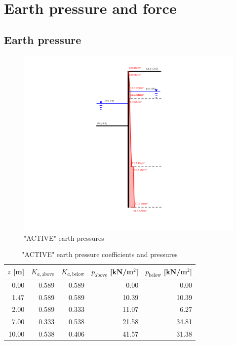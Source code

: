 \section{Earth pressure and force}
\label{appendix:earth_pressure}

\subsection{Earth pressure}

\begin{figure}[H]
    \centering
    \includegraphics[width=0.75\linewidth]{figures/appendix-i/active_earth_pressure.png}
    \caption{"ACTIVE" earth pressures}
    \label{fig:appendix_earth_pressure}
\end{figure}

\begin{table}[H]
  \centering
  \caption{"ACTIVE" earth pressure coefficients and pressures}
  \label{tab:appendix_active_pressures}
  \small
  \setlength{\tabcolsep}{8pt}
  \renewcommand{\arraystretch}{1.15}
  \begin{tabular}{@{}r r r r r@{}}
    \toprule
    $z$ [m] &
    $K_{a,\text{above}}$ &
    $K_{a,\text{below}}$ &
    $p_{\text{above}}$ [kN/m$^2$] &
    $p_{\text{below}}$ [kN/m$^2$] \\
    \midrule
     0.00 & 0.589 & 0.589 &  0.00 &  0.00 \\
     1.47 & 0.589 & 0.589 & 10.39 & 10.39 \\
     2.00 & 0.589 & 0.333 & 11.07 &  6.27 \\
     7.00 & 0.333 & 0.538 & 21.58 & 34.81 \\
    10.00 & 0.538 & 0.406 & 41.57 & 31.38 \\
    \bottomrule
  \end{tabular}
\end{table}


